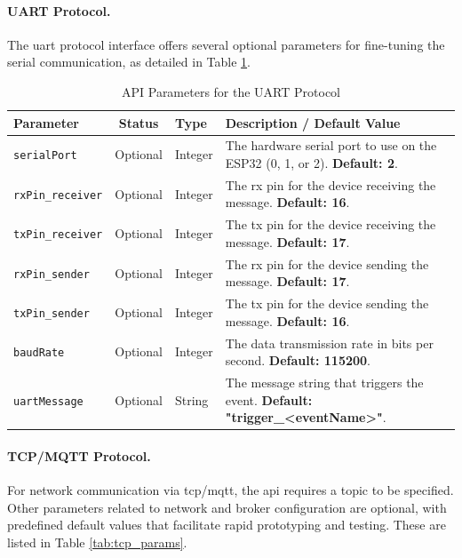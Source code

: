 \paragraph{UART Protocol.} The \gls{uart} protocol interface offers several optional parameters for fine-tuning the serial communication, as detailed in Table \ref{tab:uart_params}.

\begin{table}[h!]
    \centering
    \caption{API Parameters for the UART Protocol}
    \label{tab:uart_params}
    \begin{tabular}{|l|c|l|p{6cm}|}
        \hline
        \textbf{Parameter} & \textbf{Status} & \textbf{Type} & \textbf{Description / Default Value} \\ \hline
        \texttt{serialPort} & Optional & Integer & The hardware serial port to use on the ESP32 (0, 1, or 2). \textbf{Default: 2}. \\ \hline
        \texttt{rxPin\_receiver} & Optional & Integer & The \gls{rx} pin for the device receiving the message. \textbf{Default: 16}. \\ \hline
        \texttt{txPin\_receiver} & Optional & Integer & The \gls{tx} pin for the device receiving the message. \textbf{Default: 17}. \\ \hline
        \texttt{rxPin\_sender} & Optional & Integer & The \gls{rx} pin for the device sending the message. \textbf{Default: 17}. \\ \hline
        \texttt{txPin\_sender} & Optional & Integer & The \gls{tx} pin for the device sending the message. \textbf{Default: 16}. \\ \hline
        \texttt{baudRate} & Optional & Integer & The data transmission rate in bits per second. \textbf{Default: 115200}. \\ \hline
        \texttt{uartMessage} & Optional & String & The message string that triggers the event. \textbf{Default: "trigger\_<eventName>"}. \\ \hline
    \end{tabular}
\end{table}

\paragraph{TCP/MQTT Protocol.} For network communication via \gls{tcp}/\gls{mqtt}, the \gls{api} requires a topic to be specified. Other parameters related to network and broker configuration are optional, with predefined default values that facilitate rapid prototyping and testing. These are listed in Table \ref{tab:tcp_params}.

